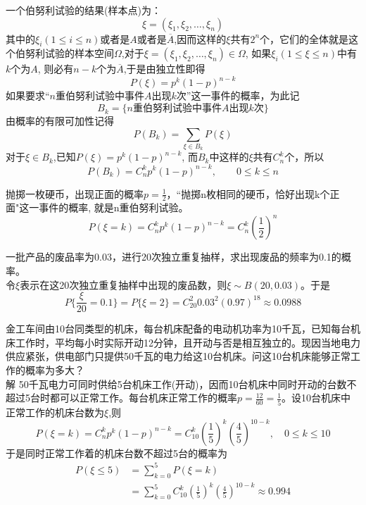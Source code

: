 \begin{frame}
一个伯努利试验的结果(样本点)为：
\[\xi=(\xi_1,\xi_2,\dots,\xi_n)\]
其中的$\xi_i(1\le i\le n)$或者是$A$或者是$\overline{A}$,因而这样的$\xi$共有$2^n$个，它们的全体就是这个伯努利试验的样本空间$\Omega$,对于$\xi=(\xi_1,\xi_2,\dots,\xi_n)\in\Omega$, 如果$\xi_i(1\le \xi\le n)$中有$k$个为$A$, 则必有$n-k$个为$\overline{A}$,于是由独立性即得
\[P(\xi)=p^k(1-p)^{n-k}\]
如果要求``$n$重伯努利试验中事件$A$出现$k$次''这一事件的概率，为此记
\[B_k=\{\text{$n$重伯努利试验中事件$A$出现$k$次}\}\]
由概率的有限可加性记得
\[P(B_k)=\sum_{\xi\in B_k}P(\xi)\]
对于$\xi\in B_k$,已知$P(\xi)=p^k(1-p)^{n-k}$, 而$B_k$中这样的$\xi$共有$C_{n}^{k}$个，所以
\[P(B_k)=C_n^k p^k(1-p)^{n-k},\qquad 0\le k\le n\]
\end{frame}

\begin{frame}
\begin{example}
   抛掷一枚硬币，出现正面的概率$p=\frac{1}{2}$，``抛掷n枚相同的硬币，恰好出现k个正面"这一事件的概率, 就是n重伯努利试验。\\
   \[P(\xi=k)=C_n^kp^k(1-p)^{n-k}=C_n^k(\frac{1}{2})^n\]
\end{example}
\begin{example}
一批产品的废品率为0.03，进行20次独立重复抽样，求出现废品的频率为0.1的概率。\\
令$\xi$表示在这20次独立重复抽样中出现的废品数，则$\xi\sim B(20,0.03)$。于是
\[P\{\frac{\xi}{20}=0.1\}=P\{\xi=2\}=C_{20}^{2}0.03^{2}(0.97)^{18}\approx 0.0988\]
\end{example}
\end{frame}

\begin{frame}
金工车间由10台同类型的机床，每台机床配备的电动机功率为10千瓦，已知每台机床工作时，平均每小时实际开动12分钟，且开动与否是相互独立的。现因当地电力供应紧张，供电部门只提供50千瓦的电力给这10台机床。问这10台机床能够正常工作的概率为多大？\\
解 50千瓦电力可同时供给5台机床工作(开动)，因而10台机床中同时开动的台数不超过5台时都可以正常工作。每台机床正常工作的概率$p=\frac{12}{60}=\frac{1}{5}$。设10台机床中正常工作的机床台数为$\xi$,则
\[P(\xi=k)=C_n^kp^k(1-p)^{n-k}=C_{10}^k(\frac{1}{5})^k(\frac{4}{5})^{10-k},\quad 0\le k\le 10 \]
于是同时正常工作着的机床台数不超过5台的概率为
\begin{align*}
P(\xi\le 5) &= \sum_{k=0}^{5}P(\xi=k)\\
&=\sum_{k=0}^{5}C_{10}^k(\frac{1}{5})^k(\frac{4}{5})^{10-k}\approx 0.994
\end{align*}
\end{frame}

